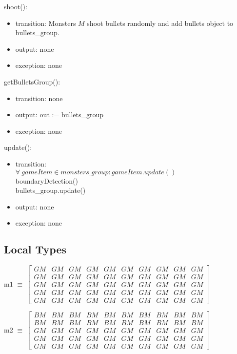 \documentclass[12pt]{article}
\begin{document}
\noindent shoot():
\begin{itemize}
\item transition: Monsters $M$ shoot bullets randomly and add bullets object to
bullets\_group.
\item output: none
\item exception: none
\end{itemize}


\noindent getBulletsGroup():
\begin{itemize}
\item transition: none
\item output: out := bullets\_group
\item exception: none
\end{itemize}

\noindent update():
\begin{itemize}
\item transition: \\$\forall\ gameItem \in monsters\_group : gameItem.update()$\\
boundaryDetection()\\
bullets\_group.update()
\item output: none
\item exception: none
\end{itemize}

\subsection*{Local Types}
m1 $\equiv$ 
$
\begin{bmatrix}
GM & GM & GM & GM & GM & GM & GM & GM & GM & GM \\
GM & GM & GM & GM & GM & GM & GM & GM & GM & GM \\
GM & GM & GM & GM & GM & GM & GM & GM & GM & GM \\
GM & GM & GM & GM & GM & GM & GM & GM & GM & GM \\
GM & GM & GM & GM & GM & GM & GM & GM & GM & GM 
\end{bmatrix}
$

\vspace{1cm}
\noindent 
m2 $\equiv$ 
$
\begin{bmatrix}
BM & BM & BM & BM & BM & BM & BM & BM & BM & BM \\
BM & BM & BM & BM & BM & BM & BM & BM & BM & BM \\
GM & GM & GM & GM & GM & GM & GM & GM & GM & GM \\
GM & GM & GM & GM & GM & GM & GM & GM & GM & GM \\
GM & GM & GM & GM & GM & GM & GM & GM & GM & GM 
\end{bmatrix}
$
\end{document}
